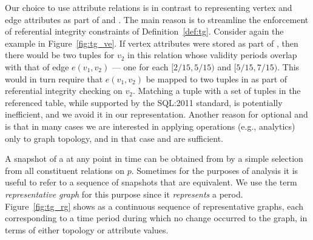
Our choice to use attribute relations is in contrast to representing
vertex and edge attributes as part of \tv and \te.  The main reason is
to streamline the enforcement of referential integrity constraints of
Definition~\ref{def:tg}.  Consider again the example in
Figure~\ref{fig:tg_ve}.  If vertex attributes were stored as part of
\tv, then there would be two tuples for $v_2$ in this relation whose
validity periods overlap with that of edge $e(v_1, v_2)$ --- one for
each $[2/15, 5/15)$ and $[5/15, 7/15)$.  This would in turn require
    that $e(v_1, v_2)$ be mapped to two tuples in \tv as part of
    referential integrity checking on $v_2$.  Matching a tuple with a
    set of tuples in the referenced table, while supported by the
    SQL:2011 standard, is potentially inefficient, and we avoid it in
    our representation.
%
Another reason for optional \tav and \tae is
that in many cases we are interested in applying operations (e.g.,
analytics) only to graph topology, and in that case \tv and \te are
sufficient.
%

A snapshot of a \tg at any point in time can be obtained from \tve by
a simple selection from all constituent relations on $p$.  Sometimes
for the purposes of analysis it is useful to refer to a sequence of
snapshots that are equivalent.  We use the term {\em representative
  graph} for this purpose since it {\em represents} a perod.
Figure~\ref{fig:tg_rg} shows  as a continuous sequence of
representative graphs, each corresponding to a time period during
which no change occurred to the graph, in terms of either topology or
attribute values.

